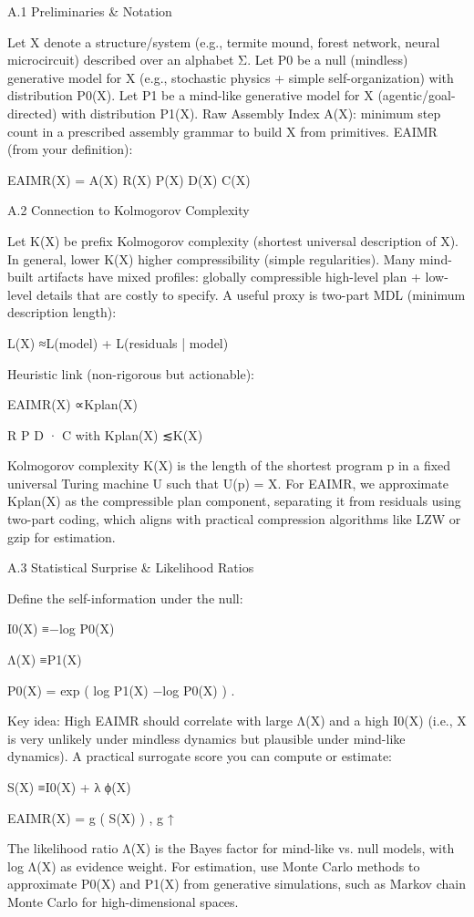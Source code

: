 \documentclass{article}
\begin{document}
A.1
Preliminaries & Notation

Let X denote a structure/system (e.g., termite mound, forest network, neural microcircuit) described over
an alphabet Σ.
Let P0 be a null (mindless) generative model for X (e.g., stochastic physics + simple self-organization)
with distribution P0(X).
Let P1 be a mind-like generative model for X (agentic/goal-directed) with distribution P1(X).
Raw Assembly Index A(X): minimum step count in a prescribed assembly grammar to build X from
primitives.
EAIMR (from your definition):

EAIMR(X) =
A(X)
R(X) P(X) D(X) C(X)

A.2
Connection to Kolmogorov Complexity

Let K(X) be prefix Kolmogorov complexity (shortest universal description of X).
In general, lower K(X) higher compressibility (simple regularities).
Many mind-built artifacts have mixed profiles: globally compressible high-level plan + low-level details
that are costly to specify.
A useful proxy is two-part MDL (minimum description length):

L(X) ≈L(model) + L(residuals | model)

Heuristic link (non-rigorous but actionable):

EAIMR(X) ∝Kplan(X)

R P D
· C
with
Kplan(X) ≲K(X)

Kolmogorov complexity K(X) is the length of the shortest program p in a fixed universal Turing machine U such that U(p) = X. For EAIMR, we approximate Kplan(X) as the compressible plan component, separating it from residuals using two-part coding, which aligns with practical compression algorithms like LZW or gzip for estimation.

A.3
Statistical Surprise & Likelihood Ratios

Define the self-information under the null:

I0(X) ≡−log P0(X)

Λ(X) ≡P1(X)

P0(X) = exp
(
log P1(X) −log P0(X)
)
.

Key idea: High EAIMR should correlate with large Λ(X) and a high I0(X) (i.e., X is very unlikely under
mindless dynamics but plausible under mind-like dynamics).
A practical surrogate score you can compute or estimate:

S(X) ≡I0(X) + λ ϕ(X)

EAIMR(X) = g
(
S(X)
)
,
g ↑

The likelihood ratio Λ(X) is the Bayes factor for mind-like vs. null
models, with log Λ(X) as evidence weight. For estimation, use Monte Carlo methods to approximate P0(X) and P1(X) from generative simulations, such as Markov chain Monte Carlo for high-dimensional spaces.
\end{document}
